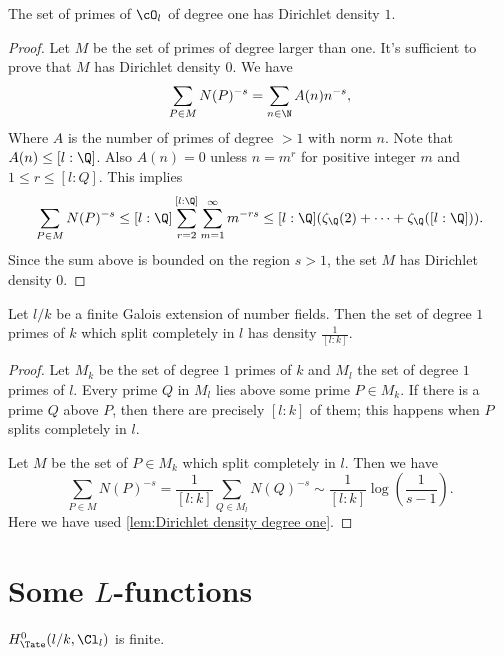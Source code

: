 \begin{lemma} \label{lem:Dirichlet density degree one}
	The set of primes of $\cO_l$ of degree one has Dirichlet density $1$.
\end{lemma}

\begin{proof}
	Let $M$ be the set of primes of degree larger than one. It's sufficient to
	prove that $M$ has Dirichlet density $0$.
	We have
	\[
		\sum_{P \in M} N(P)^{-s}
		= \sum_{n \in \N} A(n) n^{-s},
	\]
	Where $A$ is the number of primes of degree $>1$ with norm $n$.
	Note that $A(n) \le [l:\Q]$. Also $A(n)=0$ unless $n=m^r$ for positive integer $m$ and
	$1 \le r \le [l:Q]$.
	This implies
	\[
		\sum_{P \in M} N(P)^{-s}
		\le [l:\Q] \sum_{r=2}^{[l:\Q]} \sum_{m =1} ^\infty m^{-rs}
		\le [l:\Q] (\zeta_\Q(2) + \cdots + \zeta_\Q([l:\Q]) ).
	\]
	Since the sum above is bounded on the region $s > 1$,
	the set $M$ has Dirichlet density $0$.
\end{proof}


\begin{lemma} \label{lem:Dirichlet density split}
	Let $l/k$ be a finite Galois extension of number fields.
	Then the set of degree $1$ primes of $k$ which split completely in $l$
	has density $\frac{1}{[l:k]}$.
\end{lemma}

\begin{proof}
	Let $M_k$ be the set of degree $1$ primes of $k$ and $M_l$ the set of degree $1$ primes of $l$.
	Every prime $Q$ in $M_l$ lies above some prime $P \in M_k$.
	If there is a prime $Q$ above $P$, then there are precisely $[l:k]$ of them; this happens when $P$
	splits completely in $l$.

	Let $M$ be the set of $P \in M_k$ which split completely in $l$.
	Then we have
	\[
		\sum_{P \in M} N(P)^{-s}
		=
		\frac{1}{[l:k]} \sum_{Q \in M_l} N(Q)^{-s}
		\sim \frac{1}{[l:k]} \log\left( \frac{1}{s-1}\right).
	\]
	Here we have used \ref{lem:Dirichlet density degree one}.
\end{proof}





\section{Some \texorpdfstring{$L$}{L}-functions}

\begin{lemma} \label{lem:H0 idele class group finite}
	$H^0_{\Tate}(l/k,\Cl_l)$ is finite.
\end{lemma}

